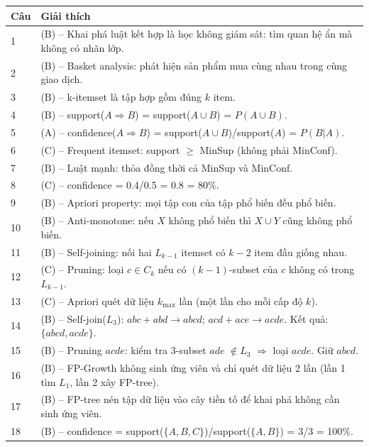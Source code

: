 \documentclass[10pt]{article}
\begin{document}
\begin{singlespace}
\begin{longtable}{|p{}|p{}|}
\hline
\textbf{Câu} & \textbf{Giải thích} \\
\hline
\endhead
1  & (B) -- Khai phá luật kết hợp là học không giám sát: tìm quan hệ ẩn mà không có nhãn lớp. \\
\hline
2  & (B) -- Basket analysis: phát hiện sản phẩm mua cùng nhau trong cùng giao dịch. \\
\hline
3  & (B) -- k-itemset là tập hợp gồm đúng $k$ item. \\
\hline
4  & (B) -- support($A \Rightarrow B$) = support($A \cup B$) = $P(A \cup B)$. \\
\hline
5  & (A) -- confidence($A \Rightarrow B$) = support($A \cup B$)/support($A$) = $P(B|A)$. \\
\hline
6  & (C) -- Frequent itemset: support $\geq$ MinSup (không phải MinConf). \\
\hline
7  & (B) -- Luật mạnh: thỏa đồng thời cả MinSup và MinConf. \\
\hline
8  & (C) -- confidence = 0.4/0.5 = 0.8 = 80\%. \\
\hline
9  & (B) -- Apriori property: mọi tập con của tập phổ biến đều phổ biến. \\
\hline
10 & (B) -- Anti-monotone: nếu $X$ không phổ biến thì $X \cup Y$ cũng không phổ biến. \\
\hline
11 & (B) -- Self-joining: nối hai $L_{k-1}$ itemset có $k-2$ item đầu giống nhau. \\
\hline
12 & (C) -- Pruning: loại $c \in C_k$ nếu có $(k-1)$-subset của $c$ không có trong $L_{k-1}$. \\
\hline
13 & (C) -- Apriori quét dữ liệu $k_{\max}$ lần (một lần cho mỗi cấp độ $k$). \\
\hline
14 & (B) -- Self-join($L_3$): $abc+abd \to abcd$; $acd+ace \to acde$. Kết quả: $\{abcd, acde\}$. \\
\hline
15 & (B) -- Pruning $acde$: kiểm tra 3-subset $ade$ $\notin L_3$ $\Rightarrow$ loại $acde$. Giữ $abcd$. \\
\hline
16 & (B) -- FP-Growth không sinh ứng viên và chỉ quét dữ liệu 2 lần (lần 1 tìm $L_1$, lần 2 xây FP-tree). \\
\hline
17 & (B) -- FP-tree nén tập dữ liệu vào cây tiền tố để khai phá không cần sinh ứng viên. \\
\hline
18 & (B) -- confidence = support($\{A,B,C\}$)/support($\{A,B\}$) = 3/3 = 100\%. \\

\end{longtable}
\end{singlespace}
\end{document}
